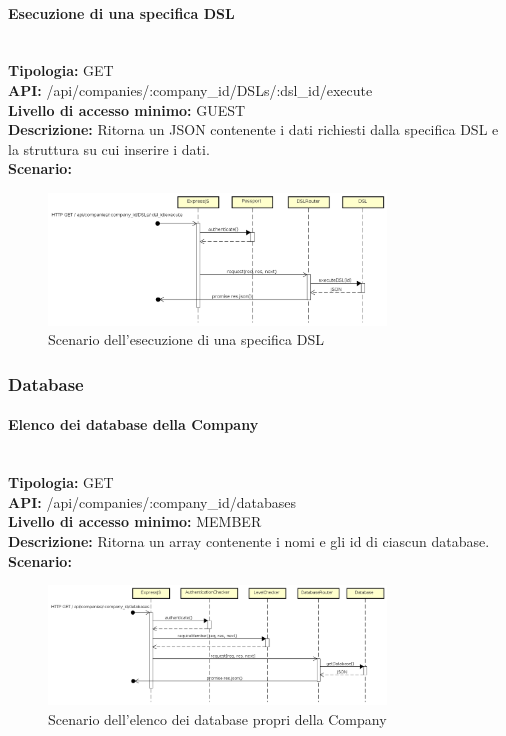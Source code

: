 \newpage
\paragraph{Esecuzione di una specifica DSL}\mbox{}\\
\textbf{Tipologia:} GET \\
\textbf{API:} /api/companies/:company\_id/DSLs/:dsl\_id/execute \\
\textbf{Livello di accesso minimo:} GUEST \\
\textbf{Descrizione:} Ritorna un JSON contenente i dati richiesti dalla specifica DSL e la struttura su cui inserire i dati. \\
\textbf{Scenario:} 
\begin{figure}[H]
\centering
\includegraphics[width=0.8\textwidth]{res/sections/backend/sequence/(GET)dslByIDex.png}
\caption{Scenario dell'esecuzione di una specifica DSL}
\end{figure}

\newpage
\subsubsection{Database}
\paragraph{Elenco dei database della Company}\mbox{}\\
\textbf{Tipologia:} GET \\
\textbf{API:} /api/companies/:company\_id/databases \\
\textbf{Livello di accesso minimo:} MEMBER \\
\textbf{Descrizione:} Ritorna un array contenente i nomi e gli id di ciascun database. \\
\textbf{Scenario:}
\begin{figure}[H]
\centering
\includegraphics[width=0.8\textwidth]{res/sections/backend/sequence/(GET)database.png}
\caption{Scenario dell'elenco dei database propri della Company}
\end{figure}

